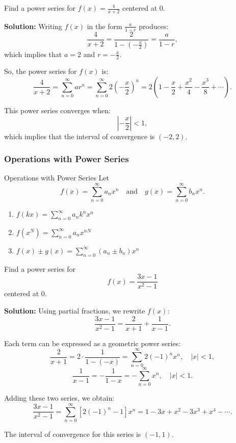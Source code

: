 \documentclass[12pt]{article}
\theoremstyle{beautifulthm}
\begin{document}
\begin{tcolorbox}[colback=examplebg, colframe=red!75!black, title=\textbf{EXAMPLE 1: Finding a Geometric Power Series Centered at 0}, fonttitle=\bfseries, sharp corners]

Find a power series for $f(x) = \frac{4}{x+2}$ centered at $0$.

\tcblower
\textbf{Solution:} 
Writing $f(x)$ in the form $\frac{a}{1-r}$ produces:
\[
\frac{4}{x+2} = \frac{2}{1 - \left(-\frac{x}{2}\right)} = \frac{a}{1-r},
\]
which implies that $a = 2$ and $r = -\frac{x}{2}$.

So, the power series for $f(x)$ is:
\[
\frac{4}{x+2} = \sum_{n=0}^\infty ar^n = \sum_{n=0}^\infty 2\left(-\frac{x}{2}\right)^n = 2\left(1 - \frac{x}{2} + \frac{x^2}{4} - \frac{x^3}{8} + \cdots \right).
\]

This power series converges when:
\[
\left| -\frac{x}{2} \right| < 1,
\]
which implies that the interval of convergence is $(-2, 2)$.
\end{tcolorbox}

\newpage
\subsubsection{Operations with Power Series}
\begin{Note}{Operations with Power Series}{}
Let 
\[
f(x) = \sum_{n=0}^\infty a_n x^n \quad \text{and} \quad g(x) = \sum_{n=0}^\infty b_n x^n.
\]

\begin{enumerate}
    \item $f(kx) = \sum_{n=0}^\infty a_n k^n x^n$
    \item $f(x^N) = \sum_{n=0}^\infty a_n x^{nN}$
    \item $f(x) \pm g(x) = \sum_{n=0}^\infty (a_n \pm b_n)x^n$
\end{enumerate}
\end{Note}
\begin{tcolorbox}[colback=examplebg, colframe=red!75!black, title=\textbf{EXAMPLE 2: Adding Two Power Series}, fonttitle=\bfseries, sharp corners]
Find a power series for 
\[
f(x) = \frac{3x - 1}{x^2 - 1}
\]
centered at $0$.



\tcblower
\textbf{Solution:} 
Using partial fractions, we rewrite $f(x)$:
\[
\frac{3x - 1}{x^2 - 1} = \frac{2}{x + 1} + \frac{1}{x - 1}.
\]

Each term can be expressed as a geometric power series:
\[
\frac{2}{x + 1} = 2 \cdot \frac{1}{1 - (-x)} = \sum_{n=0}^\infty 2(-1)^n x^n, \quad |x| < 1,
\]
\[
\frac{1}{x - 1} = -\frac{1}{1 - x} = -\sum_{n=0}^\infty x^n, \quad |x| < 1.
\]

Adding these two series, we obtain:
\[
\frac{3x - 1}{x^2 - 1} = \sum_{n=0}^\infty [2(-1)^n - 1]x^n = 1 - 3x + x^2 - 3x^3 + x^4 - \cdots.
\]

The interval of convergence for this series is $(-1, 1)$.
\end{tcolorbox}
\end{document}
